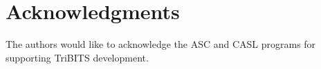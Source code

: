 \documentclass[11pt]{SANDreport}
\begin{document}
%
\clearpage
\section*{Acknowledgments}
The authors would like to acknowledge the ASC and CASL programs for supporting TriBITS development.
%
%

%
\clearpage
\tableofcontents



\end{document}
